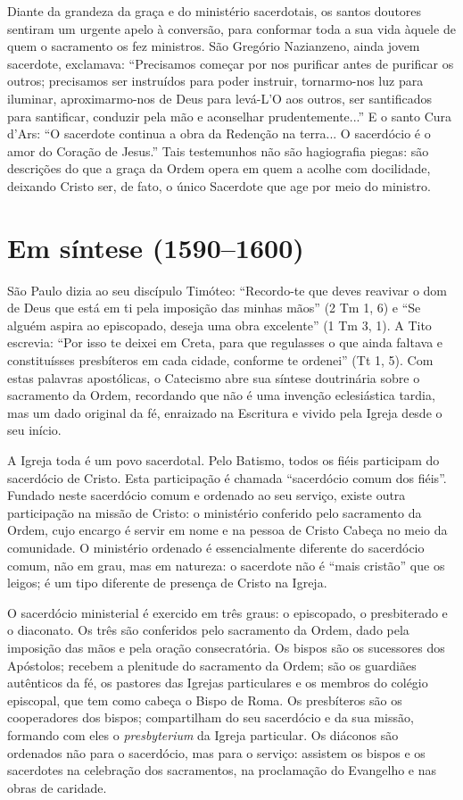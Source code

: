 Diante da grandeza da graça e do ministério sacerdotais, os santos doutores sentiram um urgente apelo à conversão, para conformar toda a sua vida àquele de quem o sacramento os fez ministros. São Gregório Nazianzeno, ainda jovem sacerdote, exclamava: ``Precisamos começar por nos purificar antes de purificar os outros; precisamos ser instruídos para poder instruir, tornarmo-nos luz para iluminar, aproximarmo-nos de Deus para levá-L'O aos outros, ser santificados para santificar, conduzir pela mão e aconselhar prudentemente...'' E o santo Cura d'Ars: ``O sacerdote continua a obra da Redenção na terra... O sacerdócio é o amor do Coração de Jesus.'' Tais testemunhos não são hagiografia piegas: são descrições do que a graça da Ordem opera em quem a acolhe com docilidade, deixando Cristo ser, de fato, o único Sacerdote que age por meio do ministro.

\section{Em síntese (1590--1600)}

São Paulo dizia ao seu discípulo Timóteo: ``Recordo-te que deves reavivar o dom de Deus que está em ti pela imposição das minhas mãos'' (2 Tm 1, 6) e ``Se alguém aspira ao episcopado, deseja uma obra excelente'' (1 Tm 3, 1). A Tito escrevia: ``Por isso te deixei em Creta, para que regulasses o que ainda faltava e constituísses presbíteros em cada cidade, conforme te ordenei'' (Tt 1, 5). Com estas palavras apostólicas, o Catecismo abre sua síntese doutrinária sobre o sacramento da Ordem, recordando que não é uma invenção eclesiástica tardia, mas um dado original da fé, enraizado na Escritura e vivido pela Igreja desde o seu início.

A Igreja toda é um povo sacerdotal. Pelo Batismo, todos os fiéis participam do sacerdócio de Cristo. Esta participação é chamada ``sacerdócio comum dos fiéis''. Fundado neste sacerdócio comum e ordenado ao seu serviço, existe outra participação na missão de Cristo: o ministério conferido pelo sacramento da Ordem, cujo encargo é servir em nome e na pessoa de Cristo Cabeça no meio da comunidade. O ministério ordenado é essencialmente diferente do sacerdócio comum, não em grau, mas em natureza: o sacerdote não é ``mais cristão'' que os leigos; é um tipo diferente de presença de Cristo na Igreja.

O sacerdócio ministerial é exercido em três graus: o episcopado, o presbiterado e o diaconato. Os três são conferidos pelo sacramento da Ordem, dado pela imposição das mãos e pela oração consecratória. Os bispos são os sucessores dos Apóstolos; recebem a plenitude do sacramento da Ordem; são os guardiães autênticos da fé, os pastores das Igrejas particulares e os membros do colégio episcopal, que tem como cabeça o Bispo de Roma. Os presbíteros são os cooperadores dos bispos; compartilham do seu sacerdócio e da sua missão, formando com eles o \textit{presbyterium} da Igreja particular. Os diáconos são ordenados não para o sacerdócio, mas para o serviço: assistem os bispos e os sacerdotes na celebração dos sacramentos, na proclamação do Evangelho e nas obras de caridade.


